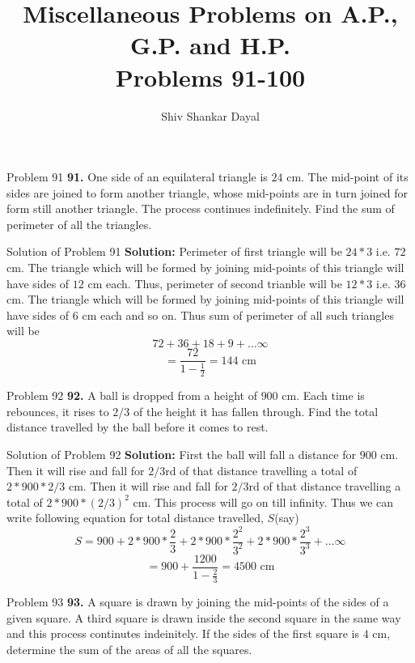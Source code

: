 \documentclass[aspectratio=1610,8pt]{beamer}
\title{Miscellaneous Problems on A.P., G.P. and H.P.\\Problems 91-100}
\author[Shiv Shankar Dayal]{Shiv Shankar Dayal}
\begin{document}
\begin{frame}
  \titlepage
\end{frame}
\begin{frame}{Problem 91}
  \textbf{91.} One side of an equilateral triangle is $24$ cm. The mid-point of its sides are joined to form another triangle,
  whose mid-points are in turn joined for form still another triangle. The process continues indefinitely. Find the sum of
  perimeter of all the triangles.
\end{frame}
\begin{frame}{Solution of Problem 91}
  \textbf{Solution:} Perimeter of first triangle will be $24*3$ i.e. $72$ cm. The triangle which will be formed by joining
  mid-points of this triangle will have sides of $12$ cm each.
  \linebreak\linebreak
  Thus, perimeter of second trianble will be $12*3$ i.e. $36$ cm. The triangle which will be formed by joining mid-points of this
  triangle will have sides of $6$ cm each and so on.
  \linebreak\linebreak
  Thus sum of perimeter of all such triangles will be $$72 + 36 + 18 + 9 + \ldots \infty$$
  $$= \frac{72}{1 - \frac{1}{2}} = 144\text{~cm}$$
\end{frame}
\begin{frame}{Problem 92}
  \textbf{92.} A ball is dropped from a height of $900$ cm. Each time is rebounces, it rises to $2/3$ of the height it has fallen
  through. Find the total distance travelled by the ball before it comes to rest.
\end{frame}
\begin{frame}{Solution of Problem 92}
  \textbf{Solution:} First the ball will fall a distance for $900$ cm. Then it will rise and fall for $2/3$rd of that distance
  travelling a total of $2*900*2/3$ cm. Then it will rise and fall for $2/3$rd of that distance travelling a total of
  $2*900*(2/3)^2$ cm. This process will go on till infinity. Thus we can write following equation for total distance travelled,
  $S$(say)
  $$S = 900 + 2*900*\frac{2}{3} + 2*900*\frac{2^2}{3^2} + 2*900*\frac{2^3}{3^3} + \ldots \infty$$
  $$= 900 + \frac{1200}{1 - \frac{2}{3}} = 4500 \text{~cm}$$
\end{frame}
\begin{frame}{Problem 93}
  \textbf{93.} A square is drawn by joining the mid-points of the sides of a given square. A third square is drawn inside the
  second square in the same way and this process continutes indeinitely. If the sides of the first square is $4$ cm, determine the
  sum of the areas of all the squares.
\end{frame}
\end{document}
